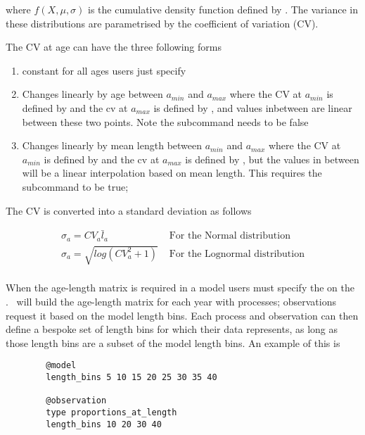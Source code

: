 where \(f(X,\mu, \sigma)\) is the cumulative density function defined by . The variance in these distributions are parametrised by the coefficient of variation (CV).

The CV at age can have the three following forms

\begin{enumerate}
	\item constant for all ages users just specify \\
	\item Changes linearly by age between \(a_{min}\) and \(a_{max}\) where the CV at \(a_{min}\) is defined by  and the cv at \(a_{max}\) is defined by , and values inbetween are linear between these two points. Note the subcommand  needs to be false
	\item Changes linearly by mean length between \(a_{min}\) and \(a_{max}\) where the CV at \(a_{min}\) is defined by  and the cv at \(a_{max}\) is defined by , but the values in between will be a linear interpolation based on mean length. This requires the subcommand  to be true;
\end{enumerate}

The CV is converted into a standard deviation as follows

\begin{align*}
	\sigma_a = CV_a \bar{l}_a & \text{ For the Normal distribution}\\
	\sigma_a = \sqrt{log(CV_a^2 + 1)} & \text{ For the Lognormal distribution}\\	
\end{align*}

When the age-length matrix is required in a model users must specify the  on the . \CNAME\ will build the age-length matrix for each year with processes; observations request it based on the model length bins. Each process and observation can then define a bespoke set of length bins for which their data represents, as long as those length bins are a subset of the model length bins. An example of this is

{\small{\begin{verbatim}
		@model
		length_bins 5 10 15 20 25 30 35 40 
		
		@observation 
		type proportions_at_length
		length_bins 10 20 30 40
\end{verbatim}}}


